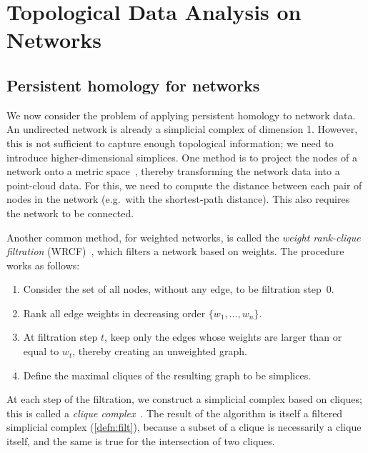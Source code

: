 \documentclass[a4paper,11pt,openany,extrafontsizes]{memoir}
\begin{document}



\chapter{Topological Data Analysis on Networks}%
\label{cha:topol-data-analys}

\section{Persistent homology for networks}%
\label{sec:pers-homol-netw}

We now consider the problem of applying persistent homology to network
data. An undirected network is already a simplicial complex of
dimension 1. However, this is not sufficient to capture enough
topological information; we need to introduce higher-dimensional
simplices. One method is to project the nodes of a network onto a
metric space~\cite{otter_roadmap_2017}, thereby transforming the
network data into a point-cloud data. For this, we need to compute the
distance between each pair of nodes in the network (e.g.\ with the
shortest-path distance). This also requires the network to be
connected. %

Another common method, for weighted networks, is called the
\emph{weight rank-clique filtration}
(WRCF)~\cite{petri_topological_2013}, which filters a network based
on weights. The procedure works as follows:
\begin{enumerate}
\item Consider the set of all nodes, without any edge, to be
  filtration step~0.
\item Rank all edge weights in decreasing order $\{w_1,\ldots,w_n\}$.
\item At filtration step $t$, keep only the edges whose weights are
  larger than or equal to $w_t$, thereby creating an unweighted graph.
\item Define the maximal cliques of the resulting graph to be
  simplices.
\end{enumerate}

At each step of the filtration, we construct a simplicial complex
based on cliques; this is called a \emph{clique
  complex}~\cite{zomorodian_tidy_2010}. The result of the algorithm is
itself a filtered simplicial complex (\autoref{defn:filt}), because a
subset of a clique is necessarily a clique itself, and the same is
true for the intersection of two cliques.
\end{document}

